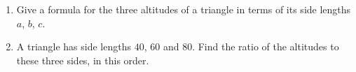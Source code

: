 \begin{enumerate}
\item[(a)] Give a formula for the three altitudes of a triangle in terms of its side lengths $a$, $b$, $c$.
\item[(b)] A triangle has side lengths $40$, $60$ and $80$. Find the ratio of the altitudes to these three sides, in this order.
\end{enumerate}
